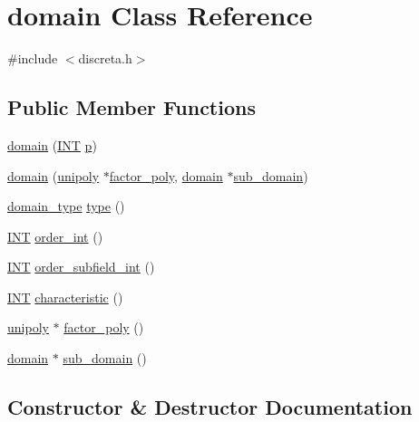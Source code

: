 \hypertarget{classdomain}{}\section{domain Class Reference}
\label{classdomain}


{\ttfamily \#include $<$discreta.\+h$>$}

\subsection*{Public Member Functions}
\begin{DoxyCompactItemize}
\item 
\mbox{\hyperlink{classdomain_a570464e8e5808cd168f95cd7495cccd1}{domain}} (\mbox{\hyperlink{galois_8h_a09fddde158a3a20bd2dcadb609de11dc}{I\+NT}} \mbox{\hyperlink{alphabet2_8_c_a533391314665d6bf1b5575e9a9cd8552}{p}})
\item 
\mbox{\hyperlink{classdomain_af04c8d8404655de03d6dadfe9294d7dc}{domain}} (\mbox{\hyperlink{classunipoly}{unipoly}} $\ast$\mbox{\hyperlink{classdomain_a0c219e2d6db2f8f4e39e270b14a85d22}{factor\+\_\+poly}}, \mbox{\hyperlink{classdomain}{domain}} $\ast$\mbox{\hyperlink{classdomain_a07bc19f58d063402df0290c9a9ac8c57}{sub\+\_\+domain}})
\item 
\mbox{\hyperlink{discreta_8h_a3fcb7d3694a4550768d8b965fefd32eb}{domain\+\_\+type}} \mbox{\hyperlink{classdomain_ade7477ca71058c5f20a02f31c9639863}{type}} ()
\item 
\mbox{\hyperlink{galois_8h_a09fddde158a3a20bd2dcadb609de11dc}{I\+NT}} \mbox{\hyperlink{classdomain_aa8dcedfd93e3a8db0069a08b9f0bfff7}{order\+\_\+int}} ()
\item 
\mbox{\hyperlink{galois_8h_a09fddde158a3a20bd2dcadb609de11dc}{I\+NT}} \mbox{\hyperlink{classdomain_aca55200b8df1de0873984afa75da5633}{order\+\_\+subfield\+\_\+int}} ()
\item 
\mbox{\hyperlink{galois_8h_a09fddde158a3a20bd2dcadb609de11dc}{I\+NT}} \mbox{\hyperlink{classdomain_a821a7f119bb67776aa0521253a98e65c}{characteristic}} ()
\item 
\mbox{\hyperlink{classunipoly}{unipoly}} $\ast$ \mbox{\hyperlink{classdomain_a0c219e2d6db2f8f4e39e270b14a85d22}{factor\+\_\+poly}} ()
\item 
\mbox{\hyperlink{classdomain}{domain}} $\ast$ \mbox{\hyperlink{classdomain_a07bc19f58d063402df0290c9a9ac8c57}{sub\+\_\+domain}} ()
\end{DoxyCompactItemize}


\subsection{Constructor \& Destructor Documentation}
\mbox{\label{classdomain_a570464e8e5808cd168f95cd7495cccd1}} 
